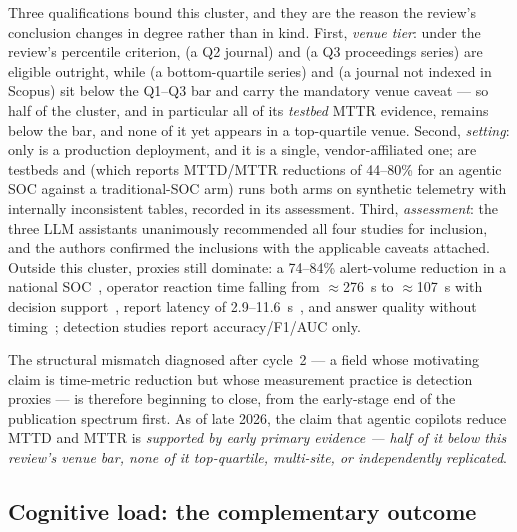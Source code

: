 \documentclass{ieeeaccess}
\begin{document}
Three qualifications bound this cluster, and they are the reason the
review's conclusion changes in degree rather than in kind. First,
\emph{venue tier}: under the review's percentile criterion,
\cite{P123} (a Q2 journal) and \cite{P100} (a Q3 proceedings series)
are eligible outright, while \cite{P101} (a bottom-quartile series) and
\cite{P102} (a journal not indexed in Scopus) sit below the Q1--Q3 bar
and carry the mandatory venue caveat --- so half of the cluster, and in
particular all of its \emph{testbed} MTTR evidence, remains below the
bar, and none of it yet appears in a top-quartile venue. Second,
\emph{setting}: only \cite{P100} is a production deployment, and it is
a single, vendor-affiliated one; \cite{P101,P102} are testbeds and
\cite{P93} (which reports MTTD/MTTR reductions of 44--80\% for an
agentic SOC against a traditional-SOC arm) runs both arms on synthetic
telemetry with internally inconsistent tables, recorded in its
assessment. Third, \emph{assessment}: the three LLM assistants
unanimously recommended all four studies for inclusion, and the
authors confirmed the inclusions with the applicable caveats attached. Outside this cluster, proxies still dominate: a
74--84\% alert-volume reduction in a national SOC~\cite{P73}, operator
reaction time falling from $\approx$276~s to $\approx$107~s with
decision support~\cite{P81}, report latency of
2.9--11.6~s~\cite{P87}, and answer quality without
timing~\cite{P83,P119}; detection studies report accuracy/F1/AUC only.

The structural mismatch diagnosed after cycle~2 --- a field whose
motivating claim is time-metric reduction but whose measurement practice
is detection proxies --- is therefore beginning to close, from the
early-stage end of the publication spectrum first. As of late 2026, the
claim that agentic copilots reduce MTTD and MTTR is \emph{supported by
early primary evidence --- half of it below this review's venue bar,
none of it top-quartile, multi-site, or independently replicated}.

\subsection{Cognitive load: the complementary outcome}
\label{sec:cogload}
\end{document}
